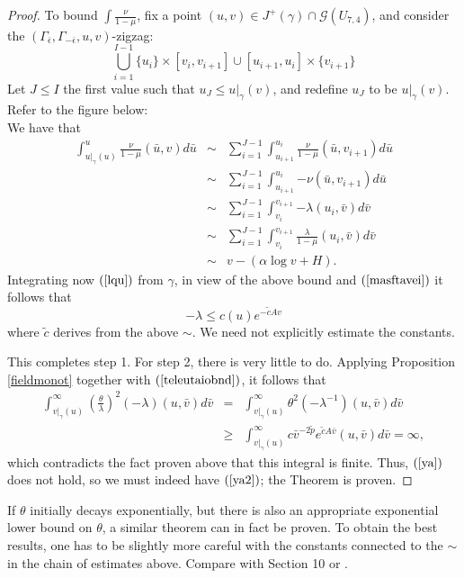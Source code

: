 \documentclass{article}
\newcommand{\tl}{\frac{\theta}{\lambda}}
\begin{document}
{\begin{proof}
To bound $\int\frac{\nu}{1-\mu}$,
fix a point $(u,v)\in J^+(\gamma)\cap\mathcal{G}(U_{7,4})$,
and consider the 
$(\Gamma_{\overline{\epsilon}},\Gamma_{-\overline\epsilon}, u,
v)$-zigzag:
\[
\bigcup_{i=1}^{I-1}\{u_i\}\times[v_i,v_{i+1}]\cup[u_{i+1},u_i]\times\{v_{i+1}\}
\]
Let $J\le I$ the first value such that $u_J\le u|_{\gamma}(v)$,
and redefine $u_J$ to be $u|_{\gamma}(v)$.
Refer to the figure below:
\[

\]
We have that
\begin{eqnarray*}
\int_{u|_\gamma(u)}^{u}{\frac{\nu}{1-\mu}(\bar{u},v)d\bar{u}}
&\sim&
\sum_{i=1}^{J-1}
\int_{u_{i+1}}^{u_i}{\frac{\nu}{1-\mu}(\bar{u},v_{i+1})d\bar{u}}\\
&\sim&
\sum_{i=1}^{J-1}
\int_{u_{i+1}}^{u_i}{-\nu (\bar{u},v_{i+1})d\bar{u}}\\
&\sim&
\sum_{i=1}^{J-1}
\int_{v_{i}}^{v_{i+1}}{-\lambda (u_i,\bar{v}) d\bar{v}}\\
&\sim&
\sum_{i=1}^{J-1}
\int_{v_{i}}^{v_{i+1}}{\frac{\lambda}{1-\mu}(u_i,\bar{v})d\bar{v}}\\
&\sim&v-(\alpha\log v+H).
\end{eqnarray*}
Integrating now $(\ref{lqu})$ from $\gamma$, in view of the above
bound and $(\ref{masftavei})$
it follows that 
\begin{equation}
\label{teleutaiobnd}
-\lambda\le c(u)e^{-\tilde{c}Av}
\end{equation}
where $\tilde{c}$
derives from the above $\sim$. We need not explicitly estimate the constants. 

This completes step 1.
For step 2, there is very little to do.
Applying
Proposition \ref{fieldmonot} together with $(\ref{teleutaiobnd})$, 
it follows that 
\begin{eqnarray}
\label{part2}
\nonumber
\int_{v|_\gamma(u)}^{\infty}{\left(\tl\right)^2(-\lambda)(u,\bar{v})d\bar{v}}&=&
\int_{v|_\gamma(u)}^{\infty}{\theta^2(-\lambda^{-1})(u,\bar{v})d\bar{v}}\\
&\ge&\int_{v|_\gamma(u)}^{\infty}{c\bar{v}^{-2\tilde{p}}e^{\tilde{c}A\bar{v}}
(u,\bar{v})d\bar{v}}=\infty,
\end{eqnarray}
which contradicts the fact proven above that this integral
is finite. Thus, $(\ref{ya})$ does not hold, so we must
indeed have $(\ref{ya2})$; the Theorem is proven. \end{proof}

If $\theta$ initially decays exponentially,
but there is also an appropriate exponential lower bound on $\theta$,
a similar theorem can in fact be proven.
To obtain the best results,
one has to be slightly more careful with the constants
connected to the $\sim$ in the chain of estimates above.
Compare with Section 10 or \cite{md:si}.

}
\end{document}
